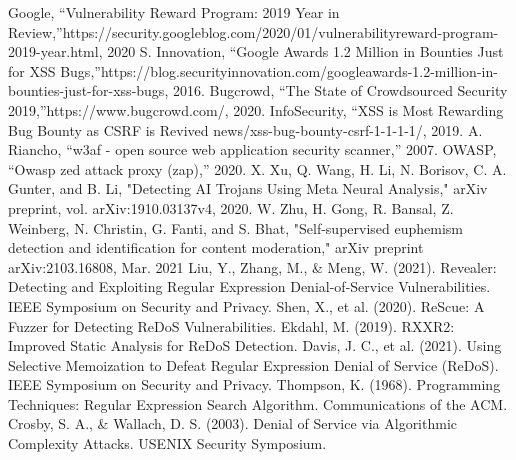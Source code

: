 \documentclass[conference]{IEEEtran}
\begin{document}
\begin{thebibliography}{00}
 Google, “Vulnerability Reward Program: 2019 Year in Review,”https://security.googleblog.com/2020/01/vulnerabilityreward-program-2019-year.html, 2020
 S. Innovation, “Google Awards 1.2 Million in Bounties Just for XSS Bugs,”https://blog.securityinnovation.com/googleawards-1.2-million-in-bounties-just-for-xss-bugs, 2016.
  Bugcrowd, “The State of Crowdsourced Security 2019,”https://www.bugcrowd.com/, 2020.
 InfoSecurity, “XSS is Most Rewarding Bug Bounty as
CSRF is Revived
news/xss-bug-bounty-csrf-1-1-1-1/, 2019.
  A. Riancho, “w3af - open source web application security scanner,” 2007.
  OWASP, “Owasp zed attack proxy (zap),” 2020.
X. Xu, Q. Wang, H. Li, N. Borisov, C. A. Gunter, and B. Li, "Detecting AI Trojans Using Meta Neural Analysis," arXiv preprint, vol. arXiv:1910.03137v4, 2020. 
W. Zhu, H. Gong, R. Bansal, Z. Weinberg, N. Christin, G. Fanti, and S. Bhat, "Self-supervised euphemism detection and identification for content moderation," arXiv preprint arXiv:2103.16808, Mar. 2021
Liu, Y., Zhang, M., \& Meng, W. (2021). Revealer: Detecting and Exploiting Regular Expression Denial-of-Service Vulnerabilities. IEEE Symposium on Security and Privacy.
Shen, X., et al. (2020). ReScue: A Fuzzer for Detecting ReDoS Vulnerabilities.
Ekdahl, M. (2019). RXXR2: Improved Static Analysis for ReDoS Detection.
Davis, J. C., et al. (2021). Using Selective Memoization to Defeat Regular Expression Denial of Service (ReDoS). IEEE Symposium on Security and Privacy.
Thompson, K. (1968). Programming Techniques: Regular Expression Search Algorithm. Communications of the ACM.
Crosby, S. A., \& Wallach, D. S. (2003). Denial of Service via Algorithmic Complexity Attacks. USENIX Security Symposium.
\end{thebibliography}
\end{document}
